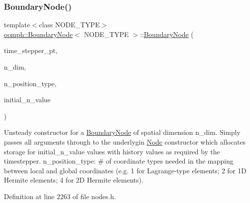 \subsubsection{\texorpdfstring{Boundary\+Node()}{BoundaryNode()}\hspace{0.1cm}{\footnotesize\ttfamily [3/6]}}
{\footnotesize\ttfamily template$<$class N\+O\+D\+E\+\_\+\+T\+Y\+PE$>$ \\
\hyperlink{classoomph_1_1BoundaryNode}{oomph\+::\+Boundary\+Node}$<$ N\+O\+D\+E\+\_\+\+T\+Y\+PE $>$\+::\hyperlink{classoomph_1_1BoundaryNode}{Boundary\+Node} (\begin{DoxyParamCaption}\item[{\hyperlink{classoomph_1_1TimeStepper}{Time\+Stepper} $\ast$const \&}]{time\+\_\+stepper\+\_\+pt,  }\item[{const unsigned \&}]{n\+\_\+dim,  }\item[{const unsigned \&}]{n\+\_\+position\+\_\+type,  }\item[{const unsigned \&}]{initial\+\_\+n\+\_\+value }\end{DoxyParamCaption})\hspace{0.3cm}{\ttfamily [inline]}}



Unsteady constructor for a \hyperlink{classoomph_1_1BoundaryNode}{Boundary\+Node} of spatial dimension n\+\_\+dim. Simply passes all arguments through to the underlygin \hyperlink{classoomph_1_1Node}{Node} constructor which allocates storage for initial\+\_\+n\+\_\+value values with history values as required by the timestepper. n\+\_\+position\+\_\+type\+: \# of coordinate types needed in the mapping between local and global coordinates (e.\+g. 1 for Lagrange-\/type elements; 2 for 1D Hermite elements; 4 for 2D Hermite elements). 



Definition at line 2263 of file nodes.\+h.

\mbox{\label{classoomph_1_1BoundaryNode_a65d27f75e6e015ceb1978be7d3cd83bc}} 
